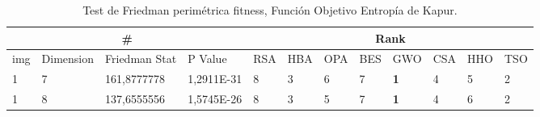 \documentclass[conference]{IEEEtran}
\begin{document}
\begin{table*}[]
	\centering
	\caption{Test de Friedman perimétrica fitness, Función Objetivo Entropía de Kapur.} 
	\begin{tabular}{|llll|llllllll|}
		\hline
		\multicolumn{4}{|c|}{\#} & \multicolumn{8}{c|}{Rank} \\ \hline
		\multicolumn{1}{|l|}{img} & \multicolumn{1}{l|}{Dimension} & \multicolumn{1}{l|}{Friedman Stat} & P Value & \multicolumn{1}{l|}{RSA} & \multicolumn{1}{l|}{HBA} & \multicolumn{1}{l|}{OPA} & \multicolumn{1}{l|}{BES} & \multicolumn{1}{l|}{GWO} & \multicolumn{1}{l|}{CSA} & \multicolumn{1}{l|}{HHO} & TSO \\ \hline 

\multicolumn{1}{|l|}{1}                                                                 & \multicolumn{1}{l|}{7}                                                                 & \multicolumn{1}{l|}{161,8777778}                                                           & 1,2911E-31                              & \multicolumn{1}{l|}{8}                                                           & \multicolumn{1}{l|}{3}                                                           & \multicolumn{1}{l|}{6}                                                           & \multicolumn{1}{l|}{7}                                                           & \multicolumn{1}{l|}{\textbf{1}}                                                  & \multicolumn{1}{l|}{4}                                                           & \multicolumn{1}{l|}{5}                                                           & 2                                   \\ \hline
\multicolumn{1}{|l|}{1}                                                              & \multicolumn{1}{l|}{8}                                                                 & \multicolumn{1}{l|}{137,6555556}                                                           & 1,5745E-26                              & \multicolumn{1}{l|}{8}                                                           & \multicolumn{1}{l|}{3}                                                           & \multicolumn{1}{l|}{5}                                                           & \multicolumn{1}{l|}{7}                                                           & \multicolumn{1}{l|}{\textbf{1}}                                                  & \multicolumn{1}{l|}{4}                                                           & \multicolumn{1}{l|}{6}                                                           & 2                                   \\ \hline

\end{tabular}
\end{table*}
\end{document}
